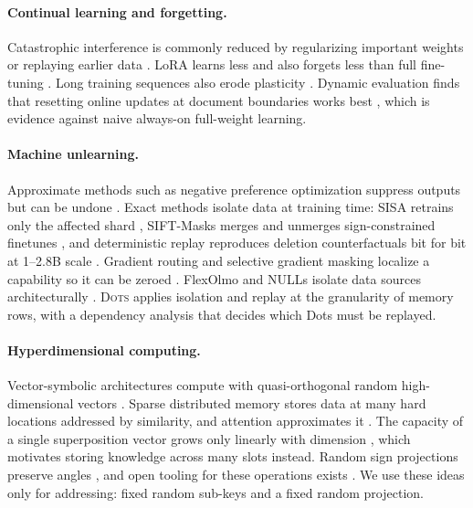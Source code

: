 \documentclass[11pt]{article}
\newcommand{\sys}{\textsc{Dots}}
\begin{document}
\paragraph{Continual learning and forgetting.} Catastrophic interference \citep{mccloskey1989} is commonly reduced by regularizing important weights \citep{kirkpatrick2017ewc} or replaying earlier data \citep{ibrahim2024simple}. LoRA \citep{hu2022lora} learns less and also forgets less than full fine-tuning \citep{biderman2024lora}. Long training sequences also erode plasticity \citep{dohare2024loss}. Dynamic evaluation finds that resetting online updates at document boundaries works best \citep{rannentriki2024dynamic}, which is evidence against naive always-on full-weight learning.

\paragraph{Machine unlearning.} Approximate methods such as negative preference optimization \citep{zhang2024npo} suppress outputs but can be undone \citep{zhang2025quant}. Exact methods isolate data at training time: SISA retrains only the affected shard \citep{bourtoule2021sisa}, SIFT-Masks merges and unmerges sign-constrained finetunes \citep{kuo2025sift}, and deterministic replay reproduces deletion counterfactuals bit for bit at 1--2.8B scale \citep{x2025trace}. Gradient routing and selective gradient masking localize a capability so it can be zeroed \citep{cloud2024gradient,shilov2025sgtm}. FlexOlmo and NULLs isolate data sources architecturally \citep{shi2025flexolmo,ghosal2026nulls}. \sys{} applies isolation and replay at the granularity of memory rows, with a dependency analysis that decides which Dots must be replayed.

\paragraph{Hyperdimensional computing.} Vector-symbolic architectures compute with quasi-orthogonal random high-dimensional vectors \citep{plate1995hrr,kanerva2009hdc}. Sparse distributed memory \citep{kanerva1988sdm} stores data at many hard locations addressed by similarity, and attention approximates it \citep{bricken2021attention}. The capacity of a single superposition vector grows only linearly with dimension \citep{frady2018theory}, which motivates storing knowledge across many slots instead. Random sign projections preserve angles \citep{charikar2002simhash}, and open tooling for these operations exists \citep{heddes2023torchhd}. We use these ideas only for addressing: fixed random sub-keys and a fixed random projection.
\end{document}
